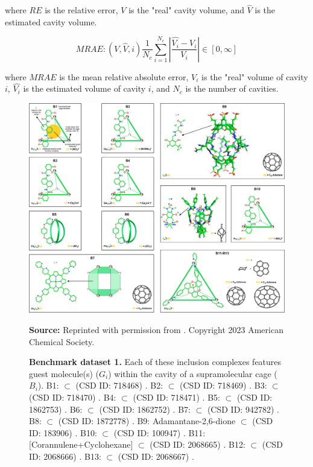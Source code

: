 \documentclass[Ingles]{phdthesis}
\begin{document}
\noindent where $RE$ is the relative error, $V$ is the "real" cavity volume, and $\hat{V}$ is the estimated cavity volume.

\begin{equation}
  MRAE \colon (V,\hat{V},i) \frac{1}{N_c} \sum_{i=1}^{N_c} \left| \frac{\hat{V_i} - V_i}{V_i} \right| \in [0,\infty]
  \label{eq:mrae}
\end{equation}

\noindent where $MRAE$ is the mean relative absolute error, $V_i$ is the "real" volume of cavity $i$, $\hat{V_i}$ is the estimated volume of cavity $i$, and $N_c$ is the number of cavities.

\begin{figure}[ht]
  \centerline{\includegraphics[scale=0.9]{images/benchmark-dataset-1.png}}
  \centerline{\tiny{\textbf{Source:} Reprinted with permission from \cite{guerra2023B}. Copyright 2023 American Chemical Society.}}
  \caption[Benchmark dataset 1]{\textbf{Benchmark dataset 1.} Each of these inclusion complexes features guest molecule(s) ($G_i$) within the cavity of a supramolecular cage ($B_i$). B1:  $\subset$  (CSD ID: 718468) \cite{pluth2008}. B2:  $\subset$  (CSD ID: 718469) \cite{pluth2008}. B3:  $\subset$  (CSD ID: 718470) \cite{pluth2008}. B4:  $\subset$  (CSD ID: 718471) \cite{pluth2008}. B5:  $\subset$  (CSD ID: 1862753) \cite{steel2018}. B6:  $\subset$  (CSD ID: 1862752) \cite{steel2018}. B7:  $\subset$  (CSD ID: 942782) \cite{nakamura2013}. B8:  $\subset$  (CSD ID: 1872778) \cite{eichstaedt2019}. B9: Adamantane-2,6-dione $\subset$  (CSD ID: 183906) \cite{johnson2002}. B10:  $\subset$  (CSD ID: 100947) \cite{caulder1998}. B11: [Corannulene+Cyclohexane] $\subset$  (CSD ID: 2068665) \cite{yang2021}. B12:  $\subset$  (CSD ID: 2068666) \cite{yang2021}. B13:  $\subset$  (CSD ID: 2068667) \cite{yang2021}.}
  \label{fig:benchmark-dataset-1}
\end{figure}
\end{document}
